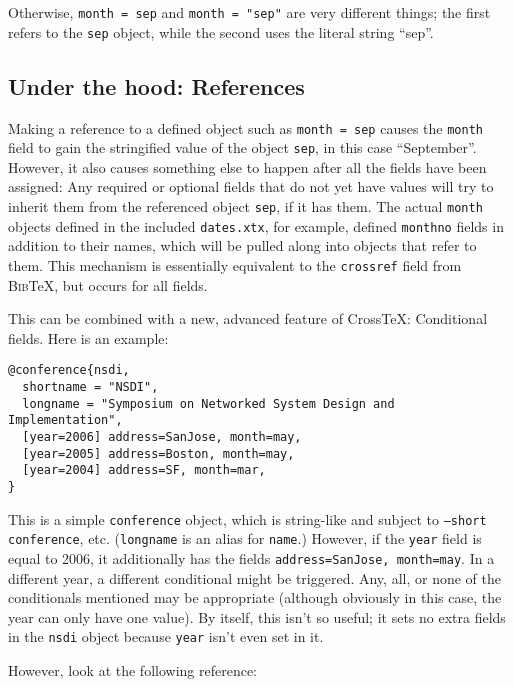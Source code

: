 \documentclass{article}
\newcommand{\XTeX}{Cross\TeX}
\newcommand{\BibTeX}{\textsc{Bib}\TeX}
\begin{document}
Otherwise, \texttt{month = sep} and \texttt{month = "sep"} are very different things; the first refers to the \texttt{sep} object, while the second uses the literal string ``sep''.


\subsection{Under the hood: References}

Making a reference to a defined object such as \texttt{month = sep} causes the \texttt{month} field to gain the stringified value of the object \texttt{sep}, in this case ``September''. However, it also causes something else to happen after all the fields have been assigned: Any required or optional fields that do not yet have values will try to inherit them from the referenced object \texttt{sep}, if it has them. The actual \texttt{month} objects defined in the included \texttt{dates.xtx}, for example, defined \texttt{monthno} fields in addition to their names, which will be pulled along into objects that refer to them. This mechanism is essentially equivalent to the \texttt{crossref} field from \BibTeX{}, but occurs for all fields.

This can be combined with a new, advanced feature of \XTeX{}: Conditional fields. Here is an example:

\begin{small}\begin{verbatim}
@conference{nsdi,
  shortname = "NSDI",
  longname = "Symposium on Networked System Design and Implementation", 
  [year=2006] address=SanJose, month=may,
  [year=2005] address=Boston, month=may,
  [year=2004] address=SF, month=mar,
}
\end{verbatim}\end{small}

This is a simple \texttt{conference} object, which is string-like and subject to \texttt{--short conference}, etc. (\texttt{longname} is an alias for \texttt{name}.) However, if the \texttt{year} field is equal to 2006, it additionally has the fields \texttt{address=SanJose, month=may}. In a different year, a different conditional might be triggered. Any, all, or none of the conditionals mentioned may be appropriate (although obviously in this case, the year can only have one value). By itself, this isn't so useful; it sets no extra fields in the \texttt{nsdi} object because \texttt{year} isn't even set in it.

However, look at the following reference:
\end{document}
